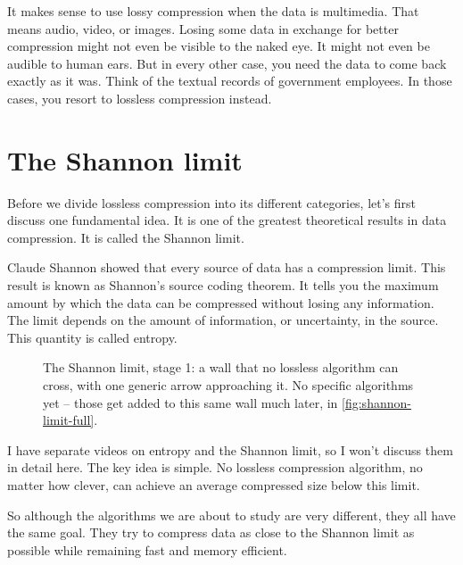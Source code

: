 \documentclass[11pt]{article}
\begin{document}
It makes sense to use lossy compression when the data is multimedia. That
means audio, video, or images. Losing some data in exchange for better
compression might not even be visible to the naked eye. It might not even be
audible to human ears. But in every other case, you need the data to come
back exactly as it was. Think of the textual records of government
employees. In those cases, you resort to lossless compression instead.

\section{The Shannon limit}
\label{sec:shannon-limit}

Before we divide lossless compression into its different categories, let's
first discuss one fundamental idea. It is one of the greatest theoretical
results in data compression. It is called the Shannon limit.

Claude Shannon showed that every source of data has a compression limit.
This result is known as Shannon's source coding theorem. It tells you the
maximum amount by which the data can be compressed without losing any
information. The limit depends on the amount of information, or
uncertainty, in the source. This quantity is called entropy.

\begin{figure}[H]
\centering
{}
\caption{The Shannon limit, stage 1: a wall that no
lossless algorithm can cross, with one generic arrow approaching it. No
specific algorithms yet -- those get added to this same wall much later, in
\cref{fig:shannon-limit-full}.}
\label{fig:shannon-limit-stage1}
\end{figure}

I have separate videos on entropy and the Shannon limit, so I won't discuss
them in detail here. The key idea is simple. No lossless compression
algorithm, no matter how clever, can achieve an average compressed size
below this limit.

So although the algorithms we are about to study are very different, they
all have the same goal. They try to compress data as close to the Shannon
limit as possible while remaining fast and memory efficient.
\end{document}
